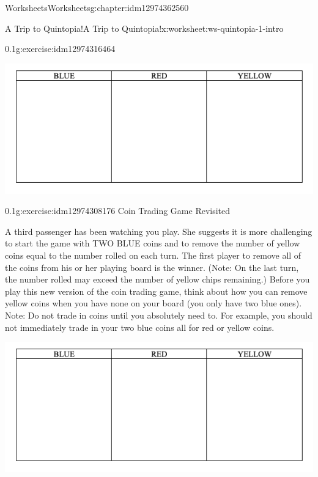 \documentclass[twoside,11pt,]{book}
\begin{document}
\begin{chapterptx}{Worksheets}{}{Worksheets}{}{}{g:chapter:idm12974362560}
\begin{worksheet-section-numberless}{A Trip to Quintopia!}{}{A Trip to Quintopia!}{}{}{x:worksheet:ws-quintopia-1-intro}
\begin{divisionexercise}{1}{}{0.1}{g:exercise:idm12974316464}
\begin{sidebyside}{1}{0.05}{0.05}{0}
\begin{sbspanel}{0.9}
\includegraphics[width=1\linewidth]{images/quintopia-table.png}
\end{sbspanel}%
\end{sidebyside}%
\end{divisionexercise}%
\clearpage
\begin{divisionexercise}{2}{}{0.1}{g:exercise:idm12974308176}%
Coin Trading Game Revisited%
\par
A third passenger has been watching you play.  She suggests it is more challenging to start the game with TWO BLUE coins and to remove the number of yellow coins equal to the number rolled on each turn.  The first player to remove all of the coins from his or her playing board is the winner.  (Note: On the last turn, the number rolled may exceed the number of yellow chips remaining.)  Before you play this new version of the coin trading game, think about how you can remove yellow coins when you have none on your board (you only have two blue ones).  Note: Do not trade in coins until you absolutely need to.  For example, you should not immediately trade in your two blue coins all for red or yellow coins.%
\begin{sidebyside}{1}{0.05}{0.05}{0}%
\begin{sbspanel}{0.9}%
\includegraphics[width=1\linewidth]{images/quintopia-table.png}
\end{sbspanel}%
\end{sidebyside}%
%
\begin{description}

\end{description}
\end{divisionexercise}
\end{worksheet-section-numberless}
\end{chapterptx}
\end{document}
